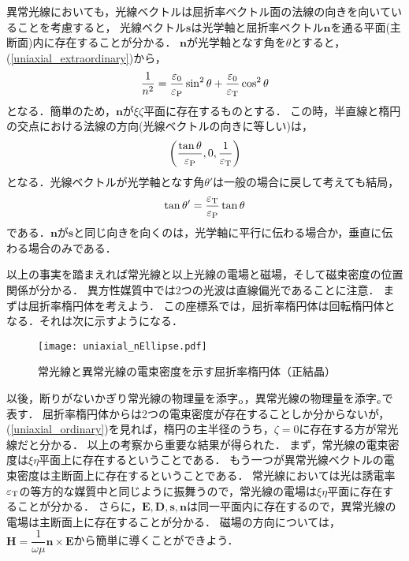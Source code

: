 異常光線においても，光線ベクトルは屈折率ベクトル面の法線の向きを向いていることを考慮すると，
光線ベクトル$\boldsymbol{s}$は光学軸と屈折率ベクトル$\boldsymbol{n}$を通る平面(主断面)内に存在することが分かる．
$\boldsymbol{n}$が光学軸となす角を$\theta$とすると，(\ref{uniaxial_extraordinary})から，
\begin{align}
  \dfrac{1}{n^2}=\dfrac{\varepsilon_0}{\varepsilon_{\text P}}\sin^2\theta+\dfrac{\varepsilon_0}{\varepsilon_{\text T}}\cos^2\theta
\end{align}
となる．簡単のため，$\boldsymbol{n}$が$\xi\zeta$平面に存在するものとする．
この時，半直線と楕円の交点における法線の方向(光線ベクトルの向きに等しい)は，
\[\left(\dfrac{\tan\theta}{\varepsilon_{\text P}},0,\dfrac{1}{\varepsilon_{\text T}}\right)\]
となる．光線ベクトルが光学軸となす角$\theta'$は一般の場合に戻して考えても結局，
\begin{align}
  \tan\theta'=\dfrac{\varepsilon_{\text T}}{\varepsilon_{\text P}}\tan\theta\label{uniaxial_sandn}
\end{align}
である．$\boldsymbol{n}$が$\boldsymbol{s}$と同じ向きを向くのは，光学軸に平行に伝わる場合か，垂直に伝わる場合のみである．

以上の事実を踏まえれば常光線と以上光線の電場と磁場，そして磁束密度の位置関係が分かる．
異方性媒質中では2つの光波は直線偏光であることに注意．
まずは屈折率楕円体を考えよう．
この座標系では，屈折率楕円体は回転楕円体となる．それは次に示すようになる．

\begin{figure}[ht]
  \centering
  \texttt{[image: uniaxial\_nEllipse.pdf]}
  \caption{常光線と異常光線の電束密度を示す屈折率楕円体（正結晶）}
  \label{uniaxial_nEllipse}
\end{figure}

以後，断りがないかぎり常光線の物理量を添字$_{\text o}$，異常光線の物理量を添字$_{\text e}$で表す．
屈折率楕円体からは2つの電束密度が存在することしか分からないが，(\ref{uniaxial_ordinary})を見れば，楕円の主半径のうち，$\zeta=0$に存在する方が常光線だと分かる．
以上の考察から重要な結果が得られた．
まず，常光線の電束密度は$\xi\eta$平面上に存在するということである．
もう一つが異常光線ベクトルの電束密度は主断面上に存在するということである．
常光線においては光は誘電率$\varepsilon_{\text T}$の等方的な媒質中と同じように振舞うので，常光線の電場は$\xi\eta$平面に存在することが分かる．
さらに，$\boldsymbol{E},\boldsymbol{D},\boldsymbol{s},\boldsymbol{n}$は同一平面内に存在するので，異常光線の電場は主断面上に存在することが分かる．
磁場の方向については，$\boldsymbol{H}=\dfrac{1}{\omega\mu}\boldsymbol{n}\times\boldsymbol{E}$から簡単に導くことができよう．

